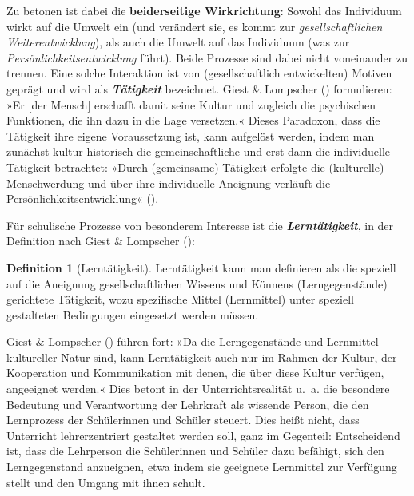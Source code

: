 \documentclass[
]{scrbook}
\theoremstyle{definition}
\newtheorem{definition}{Definition}[chapter]
\theoremstyle{definition}
\theoremstyle{definition}
\theoremstyle{definition}
\theoremstyle{remark}
\begin{document}
Zu betonen ist dabei die \textbf{beiderseitige Wirkrichtung}: Sowohl das Individuum wirkt auf die Umwelt ein (und verändert sie, es kommt zur \emph{gesellschaftlichen Weiterentwicklung}), als auch die Umwelt auf das Individuum (was zur \emph{Persönlichkeitsentwicklung} führt). Beide Prozesse sind dabei nicht voneinander zu trennen. Eine solche Interaktion ist von (gesellschaftlich entwickelten) Motiven geprägt und wird als \textbf{\emph{Tätigkeit}} bezeichnet. Giest \& Lompscher () formulieren: »Er {[}der Mensch{]} erschafft damit seine Kultur und zugleich die psychischen Funktionen, die ihn dazu in die Lage versetzen.« Dieses Paradoxon, dass die Tätigkeit ihre eigene Voraussetzung ist, kann aufgelöst werden, indem man zunächst kultur-historisch die gemeinschaftliche und erst dann die individuelle Tätigkeit betrachtet: »Durch (gemeinsame) Tätigkeit erfolgte die (kulturelle) Menschwerdung und über ihre individuelle Aneignung verläuft die Persönlichkeitsentwicklung« ().

Für schulische Prozesse von besonderem Interesse ist die \textbf{\emph{Lerntätigkeit}}, in der Definition nach Giest \& Lompscher ():

\begin{definition}[Lerntätigkeit]
\protect\hypertarget{def:Lerntaetigkeit}{}\label{def:Lerntaetigkeit}Lerntätigkeit kann man definieren als die speziell auf die Aneignung gesellschaftlichen Wissens und Könnens (Lerngegenstände) gerichtete Tätigkeit, wozu spezifische Mittel (Lernmittel) unter speziell gestalteten Bedingungen eingesetzt werden müssen.
\end{definition}

Giest \& Lompscher () führen fort: »Da die Lerngegenstände und Lernmittel kultureller Natur sind, kann Lerntätigkeit auch nur im Rahmen der Kultur, der Kooperation und Kommunikation mit denen, die über diese Kultur verfügen, angeeignet werden.« Dies betont in der Unterrichtsrealität u.~a. die besondere Bedeutung und Verantwortung der Lehrkraft als wissende Person, die den Lernprozess der Schülerinnen und Schüler steuert. Dies heißt nicht, dass Unterricht lehrerzentriert gestaltet werden soll, ganz im Gegenteil: Entscheidend ist, dass die Lehrperson die Schülerinnen und Schüler dazu befähigt, sich den Lerngegenstand anzueignen, etwa indem sie geeignete Lernmittel zur Verfügung stellt und den Umgang mit ihnen schult.
\end{document}

